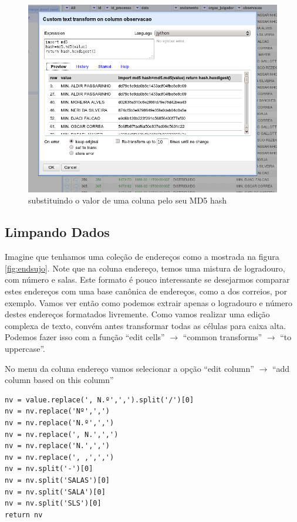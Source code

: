 \documentclass[a4paper,10pt]{report}
\begin{document}
\begin{figure}[h!]
 \includegraphics[width=12cm]{./hashing_column.png}
 \caption{substituindo o valor de uma coluna pelo seu MD5 hash}
 \label{fig:hashcode}
\end{figure}

\subsection{Limpando Dados}
\label{sec:limpdados}
Imagine que tenhamos uma coleção de endereços como a mostrada na figura \ref{fig:endsujo}. Note que na coluna endereço,  temos uma mistura de logradouro, com número e salas. Este formato é pouco interessante se desejarmos comparar estes endereços com uma base canônica de endereços, como a dos correios, por exemplo. Vamos ver então como podemos extrair apenas o logradouro e número destes endereços formatados livremente. Como vamos realizar uma edição complexa de texto, convém antes transformar todas as células para caixa alta. Podemos fazer isso com a função ``edit cells'' $\rightarrow$ ``common transforms'' $\rightarrow$ ``to uppercase''.

No menu da coluna endereço vamos selecionar a opção ``edit column'' $\rightarrow$ ``add column based on this column''

\begin{lstlisting}[label=end_limp, caption=codigo Python para limpeza dos endereços]
nv = value.replace(', N.º',',').split('/')[0] 
nv = nv.replace('Nº',',') 
nv = nv.replace('N.º',',') 
nv = nv.replace(', N.',',') 
nv = nv.replace('N.',',') 
nv = nv.replace(', ,',',') 
nv = nv.split('-')[0] 
nv = nv.split('SALAS')[0] 
nv = nv.split('SALA')[0] 
nv = nv.split('SLS')[0] 
return nv
\end{lstlisting}
 
\end{document}
